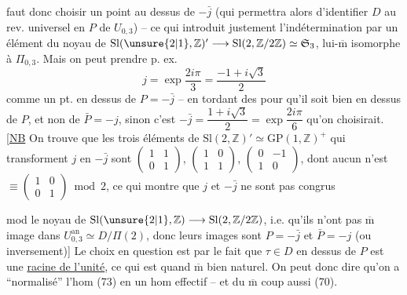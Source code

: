 faut donc choisir un point  au dessus
de $-\bar j$ (qui permettra alors d'identifier
$D$ au rev. universel  en $P$ de
$U_{0,3}$) -- ce qui introduit justement
l'indétermination par un élément du
noyau de $\mathrm{Sl}(\unsure{2|1},\mathbb Z)'\longrightarrow
\mathrm{Sl}(2,\mathbb Z/2\mathbb Z)\simeq\mathfrak S_3$,
lui-$\overline{\mathrm m}$ isomorphe à $\Pi_{0,3}$. Mais
on peut prendre p. ex.
\[
\tag{77}
j=\exp\frac{2i\pi}{3}=\frac{-1+i\sqrt{3}}{2}
\]
comme un  pt. en dessus de
$P=-\bar j$ -- en tordant des  pour
qu'il soit bien en dessus de $P$, et non
de $\bar P=-j$, sinon c'est $-\bar j=\dfrac{1+i\sqrt{3}}{2}=\exp\dfrac{2i\pi}{6}$
qu'on choisirait. [\uline{NB} On trouve que
les trois éléments de $\mathrm{Sl}(2,\mathbb Z)'\simeq\mathrm{GP}(1,\mathbb Z)^+$
qui transforment $j$ en $-\bar j$ sont
$\begin{pmatrix}1&1\\0&1\end{pmatrix}$,
$\begin{pmatrix}1&0\\1&1\end{pmatrix}$,
$\begin{pmatrix}0&-1\\1&0\end{pmatrix}$, dont aucun
n'est $\equiv\begin{pmatrix}1&0\\0&1\end{pmatrix}\bmod 2$, ce qui montre que
$j$ et $-\bar j$  ne sont pas congrus

mod le noyau  de
$\mathrm{Sl}(\unsure{2|1},\mathbb Z)\longrightarrow\mathrm{Sl}(2,\mathbb Z/2\mathbb Z)$,
i.e. qu'ils n'ont pas $\overline{\mathrm m}$ image dans $U_{0,3}^{\mathrm{an}}
\simeq D/\Pi(2)$, donc leurs images sont
$P=-\bar j$ et $\bar P=-j$ (ou inversement)] Le
choix en question est  
par le fait que $\tau\in D$ en dessus de
$P$ est  une \uline{racine de l'unité}, ce qui
est quand $\overline{\mathrm m}$ bien naturel. On peut
donc dire qu'on a ``normalisé'' l'hom
 (73) en un hom effectif -- et du
$\overline{\mathrm m}$ coup aussi (70).


